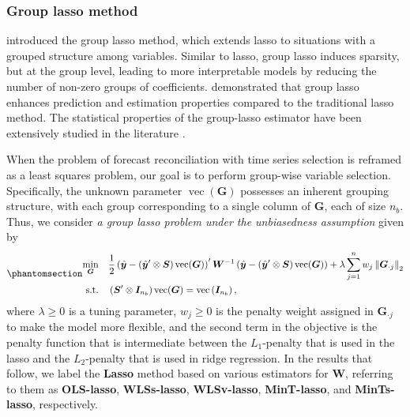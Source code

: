 \documentclass[
  11pt]{article}
\theoremstyle{plain}
\theoremstyle{remark}
\begin{document}
\subsubsection*{Group lasso method}\label{group-lasso-method}

\citet{Yuan2006-mw} introduced the group lasso method, which extends
lasso to situations with a grouped structure among variables. Similar to
lasso, group lasso induces sparsity, but at the group level, leading to
more interpretable models by reducing the number of non-zero groups of
coefficients. \citet{Lounici2011-or} demonstrated that group lasso
enhances prediction and estimation properties compared to the
traditional lasso method. The statistical properties of the group-lasso
estimator have been extensively studied in the literature
\citep[e.g.,][]{Nardi2008-asymptotic}.

When the problem of forecast reconciliation with time series selection
is reframed as a least squares problem, our goal is to perform
group-wise variable selection. Specifically, the unknown parameter
\(\operatorname{vec}(\bm{G})\) possesses an inherent grouping structure,
with each group corresponding to a single column of \(\bm{G}\), each of
size \(n_b\). Thus, we consider \emph{a group lasso problem under the
unbiasedness assumption} given by
\begin{equation}\phantomsection\label{eq-lasso}{
\begin{aligned}
\min_{\bm{G}} \quad & \frac{1}{2}\left(\hat{\bm{y}}-\left(\hat{\bm{y}}^{\prime} \otimes \bm{S}\right) \operatorname{vec}(\bm{G})\right)^{\prime} \bm{W}^{-1}\left(\hat{\bm{y}}-\left(\hat{\bm{y}}^{\prime} \otimes \bm{S}\right) \operatorname{vec}(\bm{G})\right) + \lambda \sum_{j=1}^n w_j \left\|\bm{G}_{\cdot j}\right\|_2 \\
\text{s.t.} \quad & \left(\bm{S}^{\prime} \otimes \bm{I}_{n_b}\right) \operatorname{vec}(\bm{G})=\operatorname{vec}\left(\bm{I}_{n_b}\right),
\end{aligned}
}\end{equation} where \(\lambda \geq 0\) is a tuning parameter,
\(w_j \geq 0\) is the penalty weight assigned in \(\bm{G}_{\cdot j}\) to
make the model more flexible, and the second term in the objective is
the penalty function that is intermediate between the \(L_1\)-penalty
that is used in the lasso and the \(L_2\)-penalty that is used in ridge
regression. In the results that follow, we label the \textbf{Lasso}
method based on various estimators for \(\bm{W}\), referring to them as
\textbf{OLS-lasso}, \textbf{WLSs-lasso}, \textbf{WLSv-lasso},
\textbf{MinT-lasso}, and \textbf{MinTs-lasso}, respectively.
\end{document}
